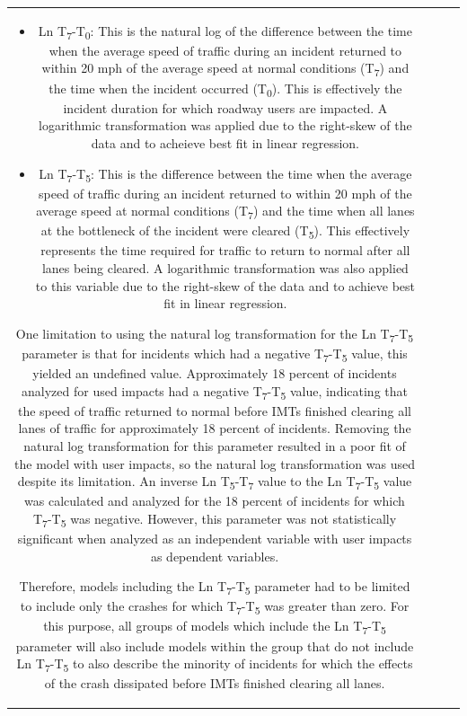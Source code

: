 \documentclass[
  letterpaper,
  authoryear]{elsarticle}
\begin{document}
\begin{table}
{\begin{tabular}[t]{c|c|c|c}
\begin{itemize}
\item
  Ln T\textsubscript{7}-T\textsubscript{0}: This is the natural log of
  the difference between the time when the average speed of traffic
  during an incident returned to within 20 mph of the average speed at
  normal conditions (T\textsubscript{7}) and the time when the incident
  occurred (T\textsubscript{0}). This is effectively the incident
  duration for which roadway users are impacted. A logarithmic
  transformation was applied due to the right-skew of the data and to
  acheieve best fit in linear regression.
\item
  Ln T\textsubscript{7}-T\textsubscript{5}: This is the difference
  between the time when the average speed of traffic during an incident
  returned to within 20 mph of the average speed at normal conditions
  (T\textsubscript{7}) and the time when all lanes at the bottleneck of
  the incident were cleared (T\textsubscript{5}). This effectively
  represents the time required for traffic to return to normal after all
  lanes being cleared. A logarithmic transformation was also applied to
  this variable due to the right-skew of the data and to achieve best
  fit in linear regression.
\end{itemize}

One limitation to using the natural log transformation for the Ln
T\textsubscript{7}-T\textsubscript{5} parameter is that for incidents
which had a negative T\textsubscript{7}-T\textsubscript{5} value, this
yielded an undefined value. Approximately 18 percent of incidents
analyzed for used impacts had a negative
T\textsubscript{7}-T\textsubscript{5} value, indicating that the speed
of traffic returned to normal before IMTs finished clearing all lanes of
traffic for approximately 18 percent of incidents. Removing the natural
log transformation for this parameter resulted in a poor fit of the
model with user impacts, so the natural log transformation was used
despite its limitation. An inverse Ln
T\textsubscript{5}-T\textsubscript{7} value to the Ln
T\textsubscript{7}-T\textsubscript{5} value was calculated and analyzed
for the 18 percent of incidents for which
T\textsubscript{7}-T\textsubscript{5} was negative. However, this
parameter was not statistically significant when analyzed as an
independent variable with user impacts as dependent variables.

Therefore, models including the Ln T\textsubscript{7}-T\textsubscript{5}
parameter had to be limited to include only the crashes for which
T\textsubscript{7}-T\textsubscript{5} was greater than zero. For this
purpose, all groups of models which include the Ln
T\textsubscript{7}-T\textsubscript{5} parameter will also include models
within the group that do not include Ln
T\textsubscript{7}-T\textsubscript{5} to also describe the minority of
incidents for which the effects of the crash dissipated before IMTs
finished clearing all lanes.


\end{tabular}}
\end{table}
\end{document}
